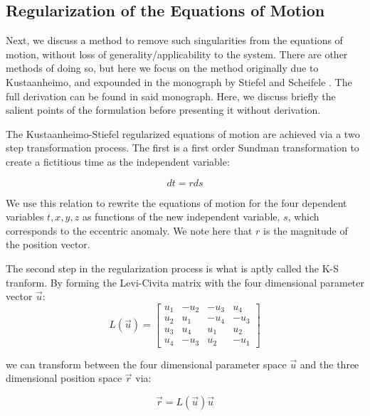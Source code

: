 \documentclass[11pt,twoside,letterpaper]{article}
\begin{document}
  \subsection {Regularization of the Equations of Motion}
  Next, we discuss a method to remove such singularities from the
  equations of motion, without loss of generality/applicability to the
  system. There are other methods of doing so, but here we focus on
  the method originally due to Kustaanheimo, and expounded in the
  monograph by Stiefel and Scheifele \cite{stiefel_1971}. The full
  derivation can be found in said monograph. Here, we discuss briefly
  the salient points of the formulation before presenting it without
  derivation.

  The Kustaanheimo-Stiefel regularized equations of motion are
  achieved via a two step transformation process. The first is a first
  order Sundman transformation to create a fictitious time as the
  independent variable:

  \begin{equation}
    dt = rds
  \end{equation}

  We use this relation to rewrite the equations of motion for the four
  dependent variables \(t, x, y, z\) as functions of the new
  independent variable, \(s\), which corresponds to the eccentric
  anomaly. We note here that \(r\) is the magnitude of the position
  vector.
 
  The second step in the regularization process is what is aptly
  called the K-S tranform. By forming the Levi-Civita matrix with the
  four dimensional parameter vector \(\vec{u}\):
  \begin{equation} \label{levi}
    L(\vec{u}) =
    \begin{bmatrix}
      u_1 & -u_2& -u_3& u_4 \\
      u_2 & u_1 & -u_4& -u_3 \\
      u_3 & u_4 & u_1 & u_2 \\
      u_4 & -u_3& u_2 & -u_1
    \end{bmatrix}
  \end{equation}

  we can transform between the four dimensional parameter space
  \(\vec{u}\) and the three dimensional position space \(\vec{r}\)
  via:

  \begin{equation} \label{xtrans}
    \vec{r} = L(\vec{u})\vec{u}
  \end{equation}
\end{document}
